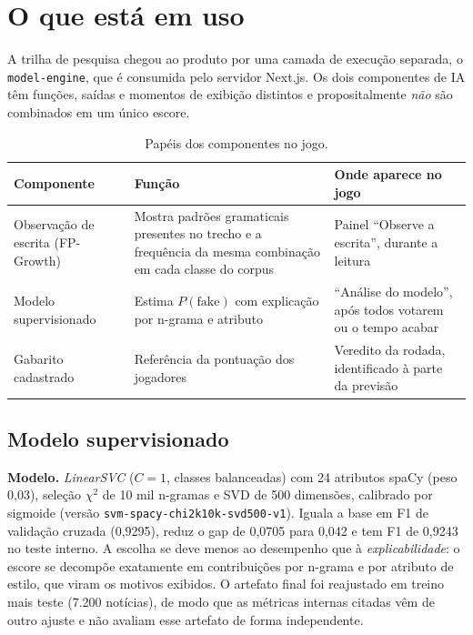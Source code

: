 \documentclass[brazilian,11pt,a4paper]{article}
\begin{document}
\section{O que está em uso}

A trilha de pesquisa chegou ao produto por uma camada de execução separada, o \texttt{model-engine}, que é consumida pelo servidor Next.js. Os dois componentes de IA têm funções, saídas e momentos de exibição distintos e propositalmente \emph{não} são combinados em um único escore.

\begin{table}[h]
\centering
\small
\begin{tabular}{@{}p{3.2cm}p{4.6cm}p{6.2cm}@{}}
\toprule
\textbf{Componente} & \textbf{Função} & \textbf{Onde aparece no jogo}\\
\midrule
Observação de escrita (FP-Growth) & Mostra padrões gramaticais presentes no trecho e a frequência da mesma combinação em cada classe do corpus & Painel ``Observe a escrita'', durante a leitura\\
Modelo supervisionado & Estima $P(\text{fake})$ com explicação por n-grama e atributo & ``Análise do modelo'', após todos votarem ou o tempo acabar\\
Gabarito cadastrado & Referência da pontuação dos jogadores & Veredito da rodada, identificado à parte da previsão\\
\bottomrule
\end{tabular}
\caption{Papéis dos componentes no jogo.}
\end{table}

\subsection{Modelo supervisionado}

\textbf{Modelo.} \textit{LinearSVC} ($C{=}1$, classes balanceadas) com 24 atributos spaCy (peso 0,03), seleção $\chi^2$ de 10 mil n-gramas e SVD de 500 dimensões, calibrado por sigmoide (versão \texttt{svm-spacy-chi2k10k-svd500-v1}). Iguala a base em F1 de validação cruzada (0,9295), reduz o gap de 0,0705 para 0,042 e tem F1 de 0,9243 no teste interno. A escolha se deve menos ao desempenho que à \emph{explicabilidade}: o escore se decompõe exatamente em contribuições por n-grama e por atributo de estilo, que viram os motivos exibidos. O artefato final foi reajustado em treino mais teste (7.200 notícias), de modo que as métricas internas citadas vêm de outro ajuste e não avaliam esse artefato de forma independente.
\end{document}
